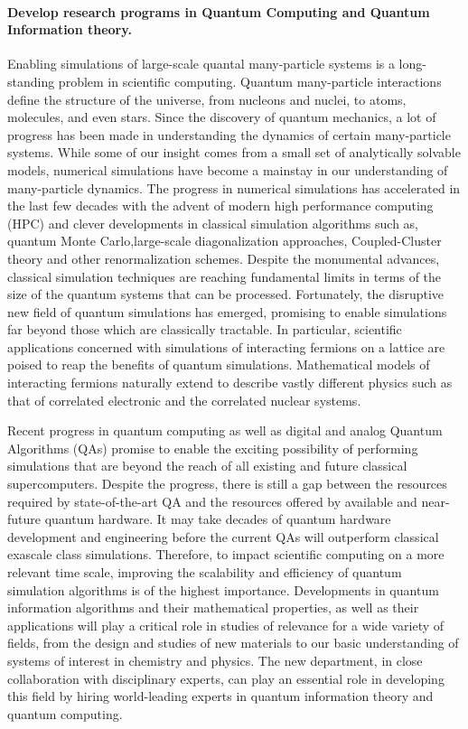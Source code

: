 \documentclass[%
oneside,                 %
final,                   %
10pt]{article}
\begin{document}
\paragraph{Develop research programs in Quantum Computing and Quantum Information theory.}
Enabling simulations of large-scale quantal many-particle systems is a
long-standing problem in scientific computing.  Quantum many-particle
interactions define the structure of the universe, from nucleons and
nuclei, to atoms, molecules, and even stars. Since the discovery of
quantum mechanics, a lot of progress has been made in understanding
the dynamics of certain many-particle systems. While some of our
insight comes from a small set of analytically solvable models,
numerical simulations have become a mainstay in our understanding of
many-particle dynamics. The progress in numerical simulations has
accelerated in the last few decades with the advent of modern high
performance computing (HPC) and clever developments in classical
simulation algorithms such as, quantum Monte Carlo,large-scale
diagonalization approaches, Coupled-Cluster theory and other
renormalization schemes.  Despite the monumental advances, classical
simulation techniques are reaching fundamental limits in terms of the
size of the quantum systems that can be processed. Fortunately, the
disruptive new field of quantum simulations has emerged, promising to
enable simulations far beyond those which are classically
tractable. In particular, scientific applications concerned with
simulations of interacting fermions on a lattice are poised to reap
the benefits of quantum simulations.  Mathematical models of
interacting fermions naturally extend to describe vastly different
physics such as that of correlated electronic and the correlated
nuclear systems.

 Recent progress in quantum computing as well as digital and analog
Quantum Algorithms (QAs) promise to enable the exciting possibility of
performing simulations that are beyond the reach of all existing and
future classical supercomputers. Despite the progress, there is still
a gap between the resources required by state-of-the-art QA and the
resources offered by available and near-future quantum hardware. It
may take decades of quantum hardware development and engineering
before the current QAs will outperform classical exascale class
simulations. Therefore, to impact scientific computing on a more
relevant time scale, improving the scalability and efficiency of
quantum simulation algorithms is of the highest
importance. Developments in quantum information algorithms and their
mathematical properties, as well as their applications will play a
critical role in studies of relevance for a wide variety of fields,
from the design and studies of new materials to our basic
understanding of systems of interest in chemistry and physics. The new
department, in close collaboration with disciplinary experts, can play
an essential role in developing this field by hiring world-leading
experts in quantum information theory and quantum computing.
\end{document}
